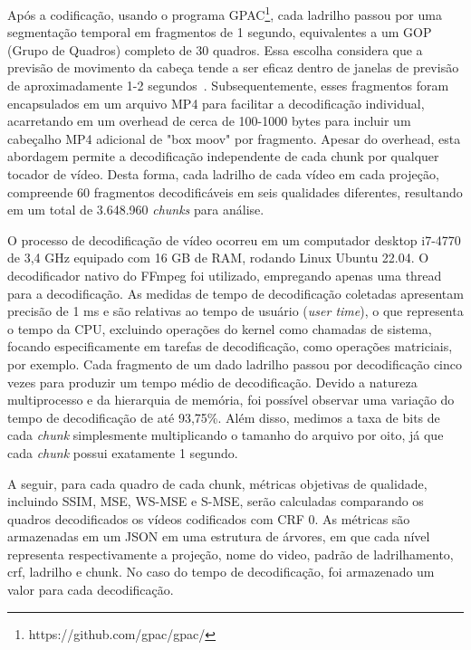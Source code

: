 Após a codificação, usando o programa GPAC\footnote{https://github.com/gpac/gpac/}, cada ladrilho passou por uma segmentação temporal em fragmentos de 1 segundo, equivalentes a um GOP (Grupo de Quadros) completo de 30 quadros. Essa escolha considera que a previsão de movimento da cabeça tende a ser eficaz dentro de janelas de previsão de aproximadamente 1-2 segundos~\cite{Qian2016}. Subsequentemente, esses fragmentos foram encapsulados em um arquivo MP4 para facilitar a decodificação individual, acarretando em um overhead de cerca de 100-1000 bytes para incluir um cabeçalho MP4 adicional de "box moov" por fragmento. Apesar do overhead, esta abordagem permite a decodificação independente de cada chunk por qualquer tocador de vídeo. Desta forma, cada ladrilho de cada vídeo em cada projeção, compreende 60 fragmentos decodificáveis em seis qualidades diferentes, resultando em um total de 3.648.960 \textit{chunks} para análise.

O processo de decodificação de vídeo ocorreu em um computador desktop i7-4770 de 3,4 GHz equipado com 16 GB de RAM, rodando Linux Ubuntu 22.04. O decodificador nativo do FFmpeg foi utilizado, empregando apenas uma thread para a decodificação. As medidas de tempo de decodificação coletadas apresentam precisão de 1 ms e são relativas ao tempo de usuário (\textit{user time}), o que representa o tempo da CPU, excluindo operações do kernel como chamadas de sistema, focando especificamente em tarefas de decodificação, como operações matriciais, por exemplo. Cada fragmento de um dado ladrilho passou por decodificação cinco vezes para produzir um tempo médio de decodificação. Devido a natureza multiprocesso e da hierarquia de memória, foi possível observar uma variação do tempo de decodificação de até 93,75\%. Além disso, medimos a taxa de bits de cada \textit{chunk} simplesmente multiplicando o tamanho do arquivo por oito, já que cada \textit{chunk} possui exatamente 1 segundo.

A seguir, para cada quadro de cada chunk, métricas objetivas de qualidade, incluindo SSIM, MSE, WS-MSE e S-MSE, serão calculadas comparando os quadros decodificados os vídeos codificados com CRF 0. As métricas são armazenadas em um JSON em uma estrutura de árvores, em que cada nível representa respectivamente a projeção, nome do video, padrão de ladrilhamento, crf, ladrilho e chunk. No caso do tempo de decodificação, foi armazenado um valor para cada decodificação.

